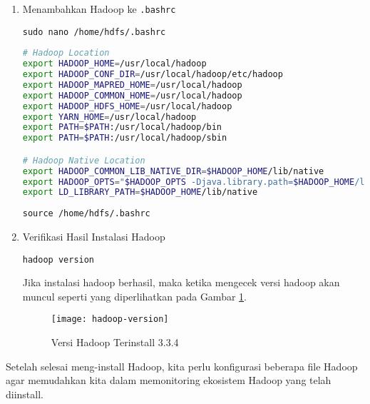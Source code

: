 \documentclass[a4paper]{tufte-handout}
\begin{document}
\begin{enumerate}
\item Menambahkan Hadoop ke {\tt .bashrc}
\begin{lstlisting}[language=Terminal]
 sudo nano /home/hdfs/.bashrc
\end{lstlisting}

\begin{lstlisting}[language=Bash]
# Hadoop Location
export HADOOP_HOME=/usr/local/hadoop
export HADOOP_CONF_DIR=/usr/local/hadoop/etc/hadoop
export HADOOP_MAPRED_HOME=/usr/local/hadoop
export HADOOP_COMMON_HOME=/usr/local/hadoop
export HADOOP_HDFS_HOME=/usr/local/hadoop
export YARN_HOME=/usr/local/hadoop
export PATH=$PATH:/usr/local/hadoop/bin
export PATH=$PATH:/usr/local/hadoop/sbin

# Hadoop Native Location
export HADOOP_COMMON_LIB_NATIVE_DIR=$HADOOP_HOME/lib/native
export HADOOP_OPTS="$HADOOP_OPTS -Djava.library.path=$HADOOP_HOME/lib/native"
export LD_LIBRARY_PATH=$HADOOP_HOME/lib/native
\end{lstlisting}

\begin{lstlisting}[language=Terminal]
 source /home/hdfs/.bashrc
\end{lstlisting}

\item Verifikasi Hasil Instalasi Hadoop
\begin{lstlisting}[language=Terminal]
 hadoop version
\end{lstlisting}

Jika instalasi hadoop berhasil, maka ketika mengecek versi hadoop akan muncul seperti yang diperlihatkan pada Gambar \ref{gam:hadoop-version}.
\begin{figure}[!ht]
\texttt{[image: hadoop-version]}
\caption{Versi Hadoop Terinstall 3.3.4}
\label{gam:hadoop-version}
\end{figure}
\end{enumerate}
 
\hrulefill

\clearpage
{}

Setelah selesai meng-install Hadoop, kita perlu konfigurasi beberapa file Hadoop agar memudahkan kita dalam memonitoring ekosistem Hadoop yang telah diinstall.
\end{document}
